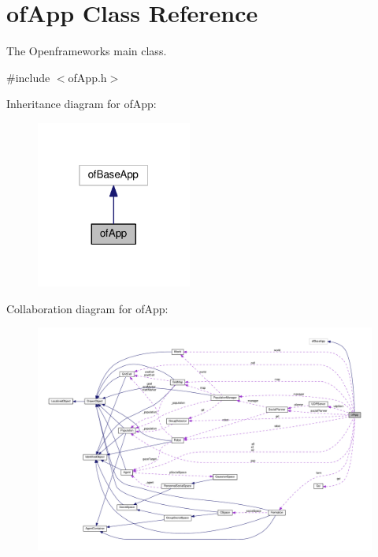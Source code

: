 \hypertarget{classofApp}{}\section{of\+App Class Reference}
\label{classofApp}


The Openframeworks main class.  




{\ttfamily \#include $<$of\+App.\+h$>$}



Inheritance diagram for of\+App\+:\nopagebreak
\begin{figure}[H]
\begin{center}
\leavevmode
\includegraphics[width=145pt]{classofApp__inherit__graph}
\end{center}
\end{figure}


Collaboration diagram for of\+App\+:\nopagebreak
\begin{figure}[H]
\begin{center}
\leavevmode
\includegraphics[width=350pt]{classofApp__coll__graph}
\end{center}
\end{figure}
